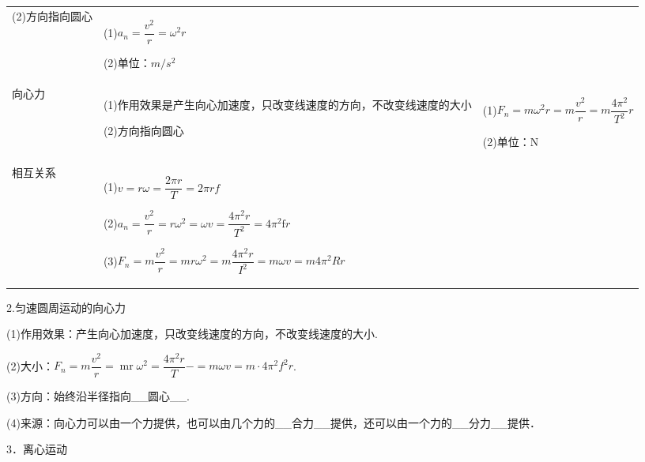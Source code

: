 \documentclass[cn,10.5pt,chinese,mac,chinesefont=founder]{elegantbook}
\begin{document}
\begin{longtable}[]{@{}m{2cm}m{9cm}m{4cm}@{}}
\begin{minipage}[t]{0.60\columnwidth}
(2)方向指向圆心\strut
\end{minipage} & \begin{minipage}[t]{0.30\columnwidth}\raggedright
(1)$a_{n}=\dfrac{v^{2}}{r}=\omega^{2} r$

(2)单位：$m/s^2 $\strut
\end{minipage}\tabularnewline
\begin{minipage}[t]{0.50\columnwidth}\raggedright
向心力\strut
\end{minipage} & \begin{minipage}[t]{0.60\columnwidth}\raggedright
(1)作用效果是产生向心加速度，只改变线速度的方向，不改变线速度的大小

(2)方向指向圆心\strut
\end{minipage} & \begin{minipage}[t]{0.30\columnwidth}\raggedright
(1)$F_{n}=m \omega^{2} r=m \dfrac{v^{2}}{r}=m \dfrac{4 \pi^{2}}{T^{2}} r$

(2)单位：N\strut
\end{minipage}\tabularnewline
\begin{minipage}[t]{0.50\columnwidth}\raggedright
相互关系\strut
\end{minipage} & \begin{minipage}[t]{0.60\columnwidth}\raggedright
(1)$v=r \omega=\dfrac{2 \pi r}{T}=2 \pi r f$

(2)$a_{n}=\dfrac{v^{2}}{r}=r \omega^{2}=\omega v=\dfrac{4 \pi^{2} r}{T^{2}}=4 \pi^{2} \mathrm{f}r$

(3)$F_{n}=m \dfrac{v^{2}}{r}=m r \omega^{2}=m \dfrac{4 \pi^{2} r}{I^{2}}=m \omega v=m 4 \pi^{2} R r$\strut
\end{minipage} & \begin{minipage}[t]{0.30\columnwidth}\raggedright
\strut
\end{minipage}\tabularnewline
\bottomrule
\end{longtable}

2.匀速圆周运动的向心力

(1)作用效果：产生向心加速度，只改变线速度的方向，不改变线速度的大小.

(2)大小：$F_{n}=m\dfrac{v^2}{r}=\operatorname{mr} \omega^{2}=\dfrac{{4 \pi^{2}} r}{{T}}-=m \omega v=m \cdot 4 \pi^{2} f^2 r$.

(3)方向：始终沿半径指向\_\_圆心\_\_.

(4)来源：向心力可以由一个力提供，也可以由几个力的\_\_合力\_\_提供，还可以由一个力的\_\_分力\_\_提供．

3．离心运动
\end{document}
